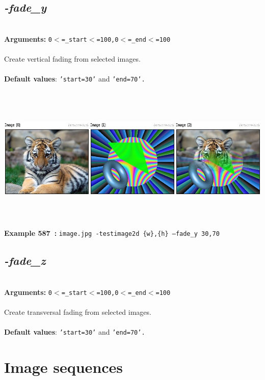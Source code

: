 \documentclass[a4paper,11pt,twoside]{book}
\begin{document}
\subsection{\emph{-fade\_y} }\vspace*{-0.5em}
~\\\textbf{Arguments: } 
{\small \texttt{0$<$=\_start$<$=100,0$<$=\_end$<$=100}}\\~\\
Create vertical fading from selected images.
~\\~\\\textbf{Default values}: {\small \texttt{'start=30'} and \texttt{'end=70'.}}
\begin{center}\includegraphics[keepaspectratio=true,height=7cm,width=\textwidth]{img/gmic_def587.jpg}\\
{\footnotesize \textbf{Example 587~:} \texttt{image.jpg -testimage2d \{w\},\{h\} --fade\_y 30,70}}
\end{center}

\subsection{\emph{-fade\_z} }\vspace*{-0.5em}
~\\\textbf{Arguments: } 
{\small \texttt{0$<$=\_start$<$=100,0$<$=\_end$<$=100}}\\~\\
Create transversal fading from selected images.
~\\~\\\textbf{Default values}: {\small \texttt{'start=30'} and \texttt{'end=70'.}}

\section{Image sequences}
\end{document}
